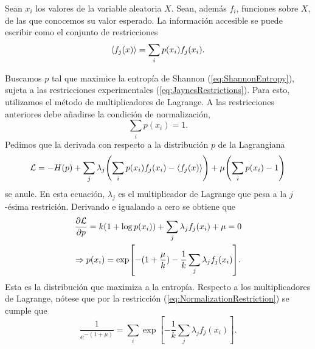 
Sean $x_{i}$ los valores de la variable aleatoria $X$.  Sean, además $f_{i}$, funciones sobre $X$, de las que conocemos su valor esperado. La información accesible se puede escribir como el conjunto de restricciones
\begin{equation}\label{eq:JaynesRestrictions}
    \expval{f_{j}(x)}=\sum_{i}p(x_{i})f_{j}(x_{i}).
\end{equation}


Buscamos $p$ tal que maximice la entropía de Shannon (\ref{eq:ShannonEntropy}), sujeta a las restricciones experimentales (\ref{eq:JaynesRestrictions}). Para esto, utilizamos el método de multiplicadores de Lagrange. A las restricciones anteriores debe añadirse la condición de normalización, 
\begin{equation}\label{eq:NormalizationRestriction}
    \sum_{i}p(x_{i})=1.
\end{equation}
Pedimos que la derivada con respecto a la distribución $p$  de la Lagrangiana
\begin{equation}
    \mathcal{L}=-H(p)+\sum_{j}\lambda_{j}\qty(\sum_{i}p(x_{i})f_{j}(x_{i})-\expval{f_{j}(x)})+\mu\qty(\sum_{i}p(x_{i})-1)\nonumber
\end{equation}
se anule. En esta ecuación, $\lambda_{j}$ es el multiplicador de Lagrange que pesa a la $j$-ésima restrición. Derivando e igualando a cero se obtiene que
\begin{gather*}
    \frac{\partial \mathcal{L}}{\partial p}=k(1+\log{p(x_{i})})+\sum_{j}\lambda_{j}f_{j}(x_{i})+\mu=0\\
    \Rightarrow p(x_{i})=\exp[-(1+\frac{\mu}{k})-\frac{1}{k}\sum_{j}\lambda_{j}f_{j}(x_{i})].
\end{gather*}
Esta es la distribución que maximiza a la entropía. Respecto a los multiplicadores de Lagrange, nótese que por la restricción (\ref{eq:NormalizationRestriction}) se cumple que
\begin{equation*}
    \frac{1}{e^{-(1+\mu)}}=\sum_{i}\exp[-\frac{1}{k}\sum_{j}\lambda_{j}f_{j}(x_{i})].
\end{equation*}
